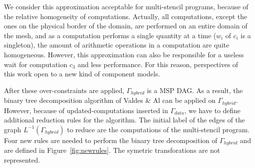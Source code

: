 We consider this approximation acceptable for multi-stencil programs, because of the relative homogeneity of computations. Actually, all computations, except the ones on the physical border of the domain, are performed on an entire domain of the mesh, and as a computation performs a single quantity at a time ($w_i$ of $c_i$ is a singleton), the amount of arithmetic operations in a computation are quite homogeneous. However, this approximation can also be responsible for a useless wait for computation $c_3$ and less performance. For this reason, perspectives of this work open to a new kind of component models.

After these over-constraints are applied, $\Gamma_{hybrid}$ is a MSP DAG. As a result, the binary tree decomposition algorithm of Valdes \& Al can be applied on $\Gamma_{hybrid}$. However, because of updated-computations inserted in $\Gamma_{data}$, we have to define additional reduction rules for the algorithm. %
The initial label of the edges of the graph $L^{-1}(\Gamma_{hybrid})$ to reduce are the computations of the multi-stencil program. Four new rules are needed to perform the binary tree decomposition of $\Gamma_{hybrid}$ and are defined in Figure~\ref{fig:newrules}. The symetric transforations are not represented.

